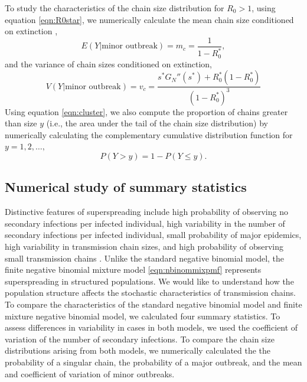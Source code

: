 \documentclass{imammb}
\numberwithin{equation}{section}
\begin{document}
To study the characteristics of the chain size distribution for $R_0>1$, using equation \eqref{eqn:R0star}, we numerically calculate the mean chain size conditioned on extinction \citep{Yan2008-jc}, 
\begin{equation}\label{eqn:meanchain}
   E(Y|\text{minor outbreak}) = m_c= \frac{1}{1-R_0^*},
\end{equation}
and the variance of chain sizes conditioned on extinction,
\begin{equation}\label{eqn:varchain}
    V(Y|\text{minor outbreak}) =v_c = \frac{s^* G_N''(s^*)+R_0^{*}(1-R_0^*)}{(1-R_0^*)^3}
\end{equation}
Using equation \eqref{eqn:cluster}, we also compute the proportion of chains greater than size $y$ (i.e., the area under the tail of the chain size distribution) by numerically calculating the complementary cumulative distribution function for $y = 1, 2,\dots,$
\begin{equation}
    P(Y>y) = 1-P(Y\leq y). 
\end{equation}


\subsection{Numerical study of summary statistics}

Distinctive features of superspreading include  high probability of observing no secondary infections per infected individual, high variability in the number of secondary infections per infected individual, small probability of major epidemics, high variability in transmission chain sizes, and high probability of observing small transmission chains \citep{Althouse2020-dn}. Unlike the standard negative binomial model, the finite negative binomial mixture model \eqref{eqn:nbinommixpmf} represents superspreading in structured populations. We would like to understand how the population structure affects the stochastic characteristics of transmission chains. To compare the characteristics of the standard negative binomial model and finite mixture negative binomial model, we calculated four summary statistics. To assess differences in variability in cases in both models, we used the coefficient of variation of the number of secondary infections. To compare the chain size distributions arising from both models, we numerically calculated the the probability of a singular chain, the probability of a major outbreak, and the mean and coefficient of variation of minor outbreaks. 
\end{document}
